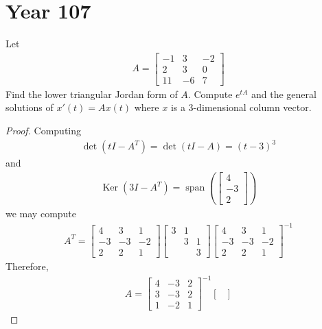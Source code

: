 \documentclass{report}
\begin{document}
\section{Year 107}
\begin{question}{}{}
Let 
 \begin{align*}
A= \begin{bmatrix}
  -1 & 3 & -2 \\
  2 & 3 & 0 \\
  11 & -6 & 7
\end{bmatrix}
\end{align*}
Find the lower triangular Jordan form of $A$. Compute  $e^{tA}$ and the general solutions of $x'(t)=Ax(t)$ where $x$ is a 3-dimensional column vector.  
\end{question}
\begin{proof}
Computing 
\begin{align*}
\operatorname{det}(tI-A^T)=\operatorname{det}(tI-A)=(t-3)^3
\end{align*}
and 
\begin{align*}
\operatorname{Ker}(3I-A^T)= \operatorname{span}(\begin{bmatrix}
4\\
-3 \\
2
\end{bmatrix})
\end{align*}
we may compute 
\begin{align*}
A^T= \begin{bmatrix}
  4 & 3 & 1 \\
  -3 & -3 & -2 \\
  2 & 2 & 1 
\end{bmatrix} \begin{bmatrix}
  3 & 1 &  \\
    & 3 & 1 \\
    & & 3
\end{bmatrix} \begin{bmatrix}
  4 & 3 & 1 \\
  -3 & -3 & -2 \\
  2 & 2 & 1 
\end{bmatrix} ^{-1}
\end{align*}
Therefore, 
\begin{align*}
A= \begin{bmatrix}
  4 & -3 & 2 \\
  3 & -3 & 2 \\
  1 & -2 & 1 
\end{bmatrix}^{-1} \begin{bmatrix}

\end{bmatrix}
\end{align*}
\end{proof}
\end{document}
